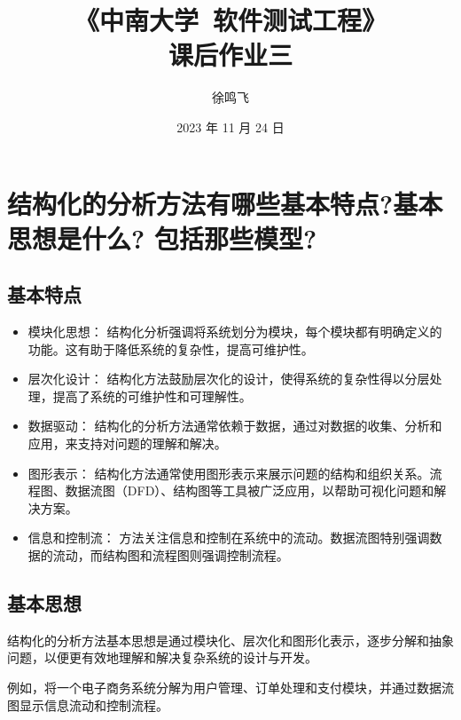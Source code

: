 \documentclass[11pt, a4paper, oneside]{ctexbook}
\title{{\Huge{\textbf{《中南大学\ 软件测试工程》}}}\\课后作业三}
\author{徐鸣飞}
\date{2023 年 11 月 24 日}
\begin{document}
\maketitle
{}
\setcounter{page}{1}
\newpage
{}
\setcounter{page}{1}
\tableofcontents
\newpage
\setcounter{page}{1}

\chapter{结构化的分析方法有哪些基本特点?基本思想是什么? 包括那些模型?}
\section{基本特点}
\begin{itemize}
    \item 模块化思想： 结构化分析强调将系统划分为模块，每个模块都有明确定义的功能。这有助于降低系统的复杂性，提高可维护性。
    \item 层次化设计： 结构化方法鼓励层次化的设计，使得系统的复杂性得以分层处理，提高了系统的可维护性和可理解性。
    \item 数据驱动： 结构化的分析方法通常依赖于数据，通过对数据的收集、分析和应用，来支持对问题的理解和解决。
    \item 图形表示： 结构化方法通常使用图形表示来展示问题的结构和组织关系。流程图、数据流图（DFD）、结构图等工具被广泛应用，以帮助可视化问题和解决方案。
    \item 信息和控制流： 方法关注信息和控制在系统中的流动。数据流图特别强调数据的流动，而结构图和流程图则强调控制流程。
\end{itemize}
\section{基本思想}
结构化的分析方法基本思想是通过模块化、层次化和图形化表示，逐步分解和抽象问题，以便更有效地理解和解决复杂系统的设计与开发。

例如，将一个电子商务系统分解为用户管理、订单处理和支付模块，并通过数据流图显示信息流动和控制流程。
\end{document}

